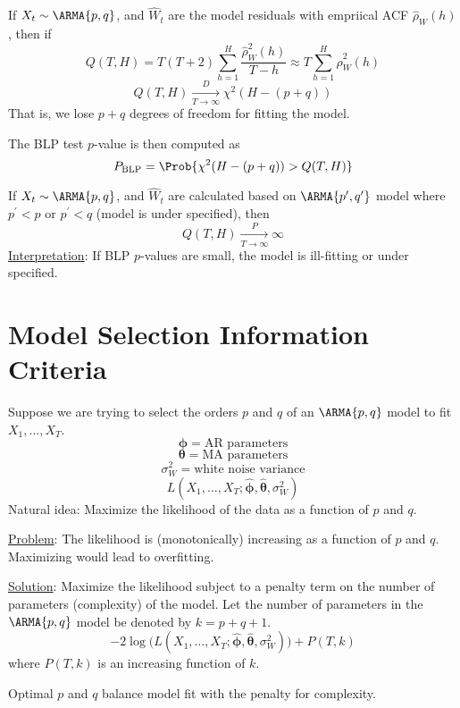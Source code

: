 If $ X_t \sim \ARMA{p,q} $, and $ \hat{W}_t $ are the model residuals
with empriical ACF $ \hat{\rho}_W(h) $, then if
\[ Q(T,H)=T(T+2)\sum_{h=1}^{H} \frac{\hat{\rho}_W^2(h)}{T-h}\approx
    T \sum_{h=1}^{H} \hat{\rho}_W^2(h)  \]
\[ Q(T,H)\xrightarrow[T\to\infty]{D}\chi^2(H-(p+q)) \]
That is, we lose $ p+q $ degrees of freedom for fitting the model.

The BLP test $ p $-value is then computed as
\[ P_{\text{BLP}}=\Prob{\chi^2(H-(p+q))>Q(T,H)} \]

\begin{Remark}{}{}
    If $ X_t \sim \ARMA{p,q} $, and $ \hat{W}_t $
    are calculated based on $ \ARMA{p^\prime,q^\prime} $ model
    where $ p^\prime <p $ or $ p^\prime <q $ (model is under specified),
    then
    \[ Q(T,H)\xrightarrow[T\to\infty]{P}\infty \]
    \underline{Interpretation}: If BLP $ p $-values are small,
    the model is ill-fitting or under specified.
\end{Remark}

\section{Model Selection Information Criteria}
Suppose we are trying to select the orders $ p $ and
$ q $ of an $ \ARMA{p,q} $ model to fit $ X_1,\ldots,X_T $.
\[ \symbf{\phi}=\text{AR parameters} \]
\[ \symbf{\theta}=\text{MA parameters} \]
\[ \sigma_W^2=\text{white noise variance} \]
\[ L(X_1,\ldots,X_T;\hat{\symbf{\phi}},\hat{\symbf{\theta}},\sigma_W^2) \]
Natural idea: Maximize the likelihood of the data as a function of
$ p $ and $ q $.

\underline{Problem}: The likelihood is (monotonically)
increasing as a function of $ p $ and $ q $. Maximizing would lead
to overfitting.

\underline{Solution}: Maximize the likelihood subject to a
penalty term on the number of parameters (complexity)
of the model. Let the number of parameters
in the $ \ARMA{p,q} $ model be denoted by $ k=p+q+1 $.
\[ -2\log\bigl(L(X_1,\ldots,X_T;\hat{\symbf{\phi}},\hat{\symbf{\theta}},\sigma_W^2)\bigr)+P(T,k) \]
where $ P(T,k) $ is an increasing function of $ k $.

Optimal $ p $ and $ q $ balance model fit with the penalty for complexity.

